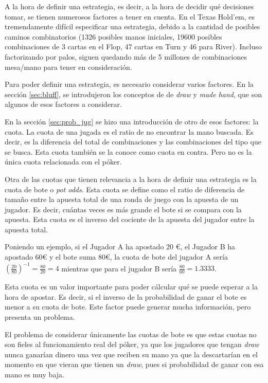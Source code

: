 A la hora de definir una estrategia, es decir, a la hora de decidir qué decisiones tomar, se tienen numerosos factores a tener en cuenta. En el Texas Hold’em, es tremendamente difícil especificar una estrategia, debido a la cantidad de posibles caminos combinatorios (1326 posibles manos iniciales, 19600 posibles combinaciones de 3 cartas en el Flop, 47 cartas en Turn y 46 para River). Incluso factorizando por palos, siguen quedando más de 5 millones de combinaciones mesa/mano para tener en consideración. 

Para poder definir una estrategia, es necesario considerar varios factores. En la sección \ref{sec:bluff}, se introdujeron los conceptos de de \textit{draw} y \textit{made hand}, que son algunos de esos factores a considerar.

En la sección \ref{sec:prob_jug} se hizo una introducción de otro de esos factores: la cuota. La cuota de una jugada es el ratio de no encontrar la mano buscada. Es decir, es la diferencia del total de combinaciones y las combinaciones del tipo que se busca. Esta cuota también se la conoce como cuota en contra. Pero no es la única cuota relacionada con el póker.

Otra de las cuotas que tienen relevancia a la hora de definir una estrategia es la cuota de bote o \textit{pot odds}. Esta cuota se define como el ratio de diferencia de tamaño entre la apuesta total de una ronda de juego con la apuesta de un jugador. Es decir, cuántas veces es más grande el bote si se compara con la apuesta. Esta cuota es el inverso del cociente de la apuesta del jugador entre la apuesta total.\cite{chen}

Poniendo un ejemplo, si el Jugador A ha apostado 20 €, el Jugador B ha apostado 60€ y el bote suma 80€, la cuota de bote del jugador A sería $(\frac{20}{80})^{-1}=\frac{80}{20}=4$ mientras que para el jugador B sería  $\frac{80}{60}=1.3333$.

Esta cuota es un valor importante para poder cálcular qué se puede esperar a la hora de apostar. Es decir, si el inverso de la probabilidad de ganar el bote es menor a su cuota de bote. Este factor puede generar mucha información, pero presenta un problema.\cite{chen}

El problema de considerar únicamente las cuotas de bote es que estas cuotas no son fieles al funcionamiento real del póker, ya que los jugadores que tengan  \textit{draw} nunca ganarían dinero una vez que reciben su mano ya que la descartarían en el momento en que vieran que tienen un \textit{draw}, pues si probabilidad de ganar con esa mano es muy baja.

